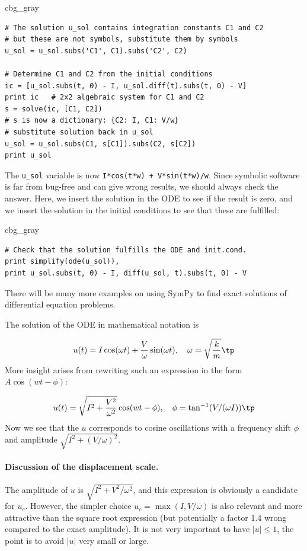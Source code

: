 \documentclass[graybox,envcountchap,sectrefs,final]{svmonodo}
\newenvironment{_cod_tight}[1]{
   \def\FrameCommand{\colorbox{#1}}
   \FrameRule0.6pt\MakeFramed {\FrameRestore}\vskip3mm}
   {\vskip0mm\endMakeFramed}
\newenvironment{cod}[1]{
\bgroup\rmfamily
\fboxsep=0mm\relax
\begin{_cod_tight}{#1}
\list{}{\parsep=-2mm\parskip=0mm\topsep=0pt\leftmargin=2mm
\rightmargin=2\leftmargin\leftmargin=4pt\relax}
\item\relax}
{\endlist\end{_cod_tight}\egroup}
\begin{document}
\begin{cod}{cbg_gray}\begin{Verbatim}[numbers=none,fontsize=\fontsize{9pt}{9pt},baselinestretch=0.95,xleftmargin=2mm]
# The solution u_sol contains integration constants C1 and C2
# but these are not symbols, substitute them by symbols
u_sol = u_sol.subs('C1', C1).subs('C2', C2)

# Determine C1 and C2 from the initial conditions
ic = [u_sol.subs(t, 0) - I, u_sol.diff(t).subs(t, 0) - V]
print ic   # 2x2 algebraic system for C1 and C2
s = solve(ic, [C1, C2])
# s is now a dictionary: {C2: I, C1: V/w}
# substitute solution back in u_sol
u_sol = u_sol.subs(C1, s[C1]).subs(C2, s[C2])
print u_sol
\end{Verbatim}
\end{cod}
\noindent
The \Verb!u_sol! variable is now \texttt{I*cos(t*w) + V*sin(t*w)/w}.
Since symbolic software is far from bug-free and can give wrong results,
we should always check the answer. Here, we insert the solution in the ODE
to see if the result is zero, and we insert the solution in the initial
conditions to see that these are fulfilled:

\begin{cod}{cbg_gray}\begin{Verbatim}[numbers=none,fontsize=\fontsize{9pt}{9pt},baselinestretch=0.95,xleftmargin=2mm]
# Check that the solution fulfills the ODE and init.cond.
print simplify(ode(u_sol)),
print u_sol.subs(t, 0) - I, diff(u_sol, t).subs(t, 0) - V
\end{Verbatim}
\end{cod}
\noindent
There will be many more examples on using SymPy to find exact solutions
of differential equation problems.

The solution of the ODE in mathematical notation is

\[ u(t) = I\cos(\omega t) + \frac{V}{\omega}\sin(\omega t),\quad \omega = \sqrt{\frac{k}{m}}\tp\]
More insight arises from rewriting such an expression in the form
$A\cos(wt - \phi)$:

\[ u(t) = \sqrt{I^2 + \frac{V^2}{\omega^2}}\cos(wt - \phi),\quad
\phi = \tan^{-1}(V/(\omega I))\tp
\]
Now we see that the $u$ corresponds to cosine oscillations with a
frequency shift $\phi$ and amplitude $\sqrt{I^2 + (V/\omega)^2}$.


\paragraph{Discussion of the displacement scale.}
The amplitude of $u$ is $\sqrt{I^2 + V^2/\omega^2}$, and this
expression is obviously a candidate for $u_c$.  However, the simpler
choice $u_c=\max (I, V/\omega)$ is also relevant and more attractive
than the square root expression (but potentially a factor 1.4 wrong
compared to the exact amplitude).  It is not very important to have
$|u|\leq 1$, the point is to avoid $|u|$ very small or large.
\end{document}
